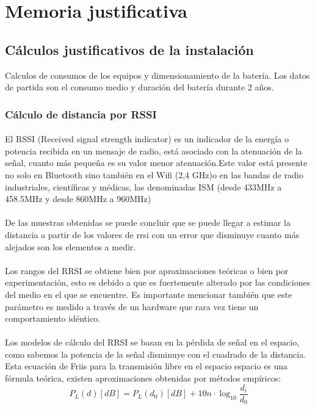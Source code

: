 \documentclass[a4paper ,12pt, onecolumn]{article}
\begin{document}
\section{Memoria justificativa}
    \subsection{Cálculos justificativos de la instalación}
        Calculos de consumos de los equipos y dimensionamiento de la batería.
        Los datos de partida son el consumo medio y duración del batería durante 2 años.
        \subsubsection{Cálculo de distancia por RSSI}
            \paragraph{}
            El RSSI (Received signal strength indicator) es un indicador de la energía o potencia recibida en un mensaje de radio, 
            está asociado con la atenuación de la señal, cuanto más pequeña es su valor menor atenuación.Este valor está 
            presente no solo en Bluetooth sino también en el Wifi (2,4 GHz)o en las bandas de radio industriales, científicas y médicas,
            las denominadas ISM (desde 433MHz a 458.5MHz y desde 860MHz a 960MHz)
            \paragraph{}
            De las muestras obtenidas se puede concluir que se puede llegar a estimar la distancia a partir de los valores
            de rrsi con un error que disminuye cuanto más alejados son los elementos a medir. 
            \paragraph{}
            Los rangos del RRSI se obtiene bien por aproximaciones teóricas o bien por experimentación, esto es debido a que 
            es fuertemente alterado por las condiciones del medio en el que se encuentre. Es importante mencionar también que
            este parámetro es medido a través de un hardware que rara vez tiene un comportamiento idéntico.
            \paragraph{}
            Los modelos de cálculo del RRSI se basan en la pérdida de señal en el espacio, como sabemos la potencia de la señal
            disminuye con el cuadrado de la distancia. Esta ecuación de Friis para la transmisión libre en el espacio espacio es 
            una fórmula teórica, existen aproximaciones obtenidas por métodos empíricos:
            \begin{equation}
                P_L(d) [dB] = P_L(d_0) [dB] + 10n ·\log_{10} \frac{ d_i }{d_0 } 
            \end{equation}
\end{document}
